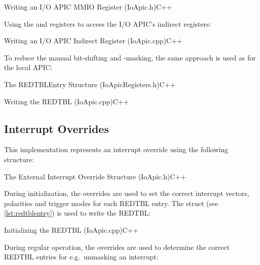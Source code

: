 \begin{codeblock}{Writing an I/O APIC MMIO Register (IoApic.h)}{C++}
\end{codeblock}

Using the  and  registers to access the I/O APIC's indirect registers:

\begin{codeblock}{Writing an I/O APIC Indirect Register (IoApic.cpp)}{C++}
\end{codeblock}

To reduce the manual bit-shifting and -masking, the same approach is used as for the local APIC\@:

\begin{codeblock}[label=lst:redtblentry]{The REDTBLEntry Structure (IoApicRegisters.h)}{C++}
\end{codeblock}

\begin{codeblock}[label=lst:writeredtbl]{Writing the REDTBL (IoApic.cpp)}{C++}
\end{codeblock}

\subsection{Interrupt Overrides}
\label{subsec:apxirqoverrides}

This implementation represents an interrupt override using the following structure:

\begin{codeblock}{The External Interrupt Override Structure (IoApic.h)}{C++}
\end{codeblock}

During initialization, the overrides are used to set the correct interrupt vectors, polarities and trigger modes for each REDTBL entry.
The  struct (see \autoref{lst:redtblentry}) is used to write the REDTBL\@:

\begin{codeblock}{Initializing the REDTBL (IoApic.cpp)}{C++}
\end{codeblock}

During regular operation, the overrides are used to determine the correct REDTBL entries for e.g.\ unmasking an interrupt:

